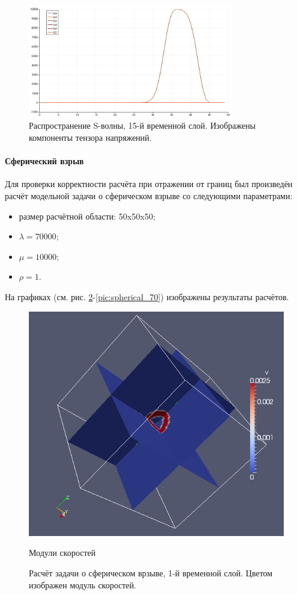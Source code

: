 \begin{figure}[htp]
\centering
\includegraphics[width=0.8\textwidth]{png/s-wave-test/s/0015.png}
\caption{Распространение S-волны, 15-й временной слой. Изображены компоненты тензора напряжений.}
\label{pic:s_wave_15}
\end{figure}

\clearpage
\newpage

\paragraph{Сферический взрыв}
Для проверки корректности расчёта при отражении от границ был произведён расчёт
модельной задачи о сферическом взрыве со следующими параметрами:
\begin{itemize}
\item размер расчётной области: 50x50x50;
\item $\lambda=70000$;
\item $\mu=10000$;
\item $\rho=1$.
\end{itemize}
На графиках (см. рис. \ref{pic:spherical_1}-\ref{pic:spherical_70}) изображены
результаты расчётов.

\begin{figure}[htp]
\centering
\includegraphics[width=\textwidth]{png/spherical-explosion-test/v-scalar/0001.png}
\caption{Модули скоростей}
\caption{Расчёт задачи о сферическом врзыве, 1-й временной слой. Цветом изображен модуль скоростей.}
\label{pic:spherical_1}
\end{figure}

